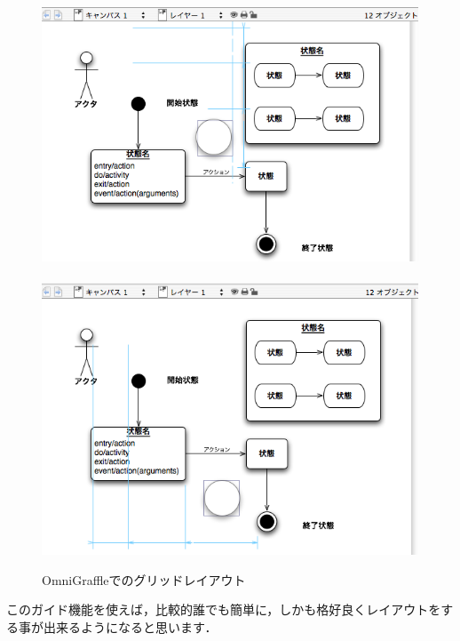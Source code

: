 \begin{figure}[htbp]
 \centering
 \mbox{\includegraphics[scale=.4]{images/omni-grid1}~
 \includegraphics[scale=.4]{images/omni-grid2}}
\caption{OmniGraffleでのグリッドレイアウト}
\end{figure}

このガイド機能を使えば，比較的誰でも簡単に，しかも格好良くレイアウトをす
る事が出来るようになると思います．





